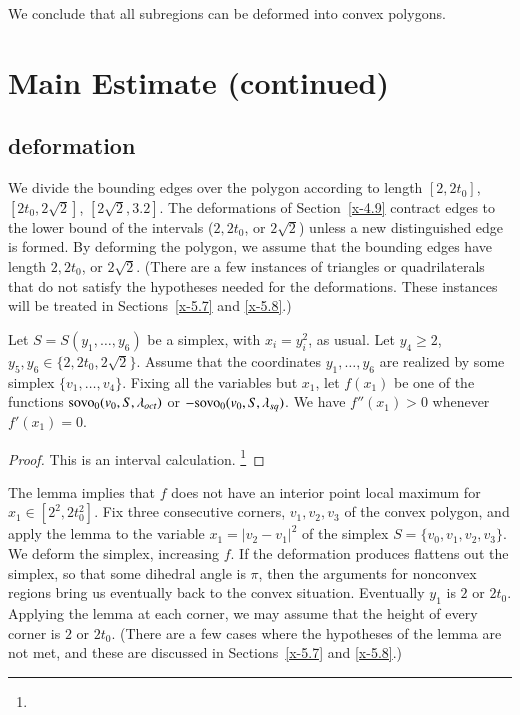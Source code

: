 We conclude that all subregions can be deformed into convex polygons.





\section{Main Estimate (continued)}%

\subsection{deformation} %
We divide the bounding edges over the polygon according to length
$[2,2t_0]$, $[2t_0,2\sqrt{2}]$, $[2\sqrt{2},3.2]$. The deformations of
Section~\ref{x-4.9} contract edges to the lower bound of the intervals
($2,2t_0$, or $2\sqrt{2}$) unless a new distinguished edge is formed. By
deforming the polygon, we assume that the bounding edges have length
$2,2t_0$, or $2\sqrt{2}$. (There are a few instances of triangles or
quadrilaterals that do not satisfy the hypotheses needed for the
deformations. These instances will be treated in Sections~\ref{x-5.7}
and \ref{x-5.8}.)

\begin{lemma}
Let $S=S(y_1,\ldots,y_6)$ be a simplex, with $x_i=y_i^2$,
as usual.  Let $y_4\ge 2$,
    $y_5,y_6\in\{2,2t_0,2\sqrt{2}\}$.
Assume that the coordinates $y_1,\ldots,y_6$ are realized by
some simplex $\{v_1,\ldots,v_4\}$.  %
Fixing all the variables but $x_1$, let $f(x_1)$ be one of the
functions ${\operatorname{sovo}}_0(v_0,S,\lambda_{oct})$ or 
$-{\operatorname{sovo}}_0(v_0,S,\lambda_{sq})$. We have $f''(x_1)>0$
whenever $f'(x_1)=0$.
\end{lemma}

\begin{proof} This is an interval calculation.%
\footnote{} %
\end{proof}



The lemma implies that $f$ does not have an interior point local maximum
for $x_1\in[2^2,2t_0^2]$.  Fix three consecutive corners, $v_1,v_2,v_3$
of the convex polygon, and apply the lemma to the variable $x_1 =
|v_2-v_1|^2$ of the simplex $S=\{v_0,v_1,v_2,v_3\}$. We deform the simplex,
increasing $f$.  If the deformation produces flattens out the simplex, 
so that some
dihedral angle is $\pi$, then the arguments for nonconvex regions bring
us eventually back to the convex situation. Eventually $y_1$ is $2$ or
$2t_0$.  Applying the lemma at each corner, we may assume that the
height of every corner is $2$ or $2t_0$.   (There are a few cases where
the hypotheses of the lemma are not met, and these are discussed in
Sections~\ref{x-5.7} and \ref{x-5.8}.)


